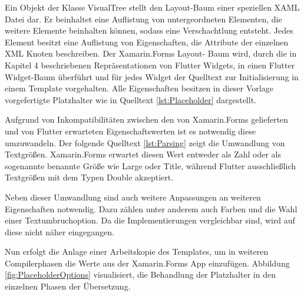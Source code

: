 Ein Objekt der Klasse VisualTree stellt den Layout-Baum einer speziellen XAML Datei dar.  Er beinhaltet eine Auflistung von untergeordneten Elementen,  die weitere Elemente beinhalten können,  sodass eine Verschachtlung entsteht.  Jedes Element besitzt eine Auflistung von Eigenschaften, die Attribute der einzelnen XML Knoten beschreiben.  Der Xamarin.Forms Layout- Baum wird,  durch die in Kapitel 4 beschriebenen Repräsentationen von Flutter Widgets, in einen Flutter Widget-Baum überführt und für jedes Widget der Quelltext zur Initialisierung in einem Template vorgehalten.  Alle Eigenschaften besitzen in dieser Vorlage vorgefertigte Platzhalter wie in Quelltext \ref{lst:Placeholder} dargestellt.

 

Aufgrund von Inkompatibilitäten zwischen den von Xamarin.Forms gelieferten und von Flutter erwarteten Eigenschaftswerten ist es notwendig diese umzuwandeln.  Der folgende Quelltext \ref{lst:Parsing} zeigt die Umwandlung von Textgrößen.  Xamarin.Forms erwartet diesen Wert entweder als Zahl oder als sogenannte benannte Größe wie Large oder Title,  während Flutter ausschließlich Textgrößen mit dem Typen Double akzeptiert.   

 

Neben dieser Umwandlung sind auch weitere Anpassungen an weiteren Eigenschaften notwendig.  Dazu zählen unter anderem auch Farben und die Wahl einer Textumbruchoption.  Da die Implementierungen vergleichbar sind,  wird auf diese nicht näher eingegangen. 

Nun erfolgt die Anlage einer Arbeitskopie des Templates,  um in weiteren Compilerphasen die Werte aus der Xamarin.Forms App einzufügen.  Abbildung \ref{fig:PlaceholderOptions} visualisiert, die Behandlung der Platzhalter in den einzelnen Phasen der Übersetzung.

